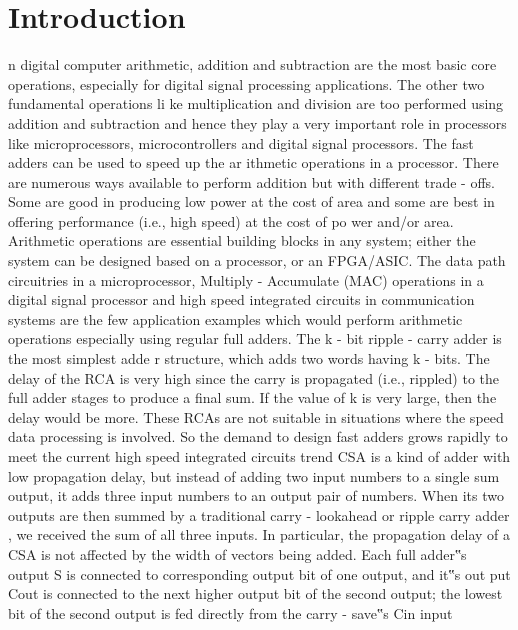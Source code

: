 \documentclass[11pt, twoside]{article}
\begin{document}
\section{Introduction}
n digital computer arithmetic, addition and subtraction are the most basic core operations, especially for 
digital  signal  processing  applications.  The  other  two  fundamental  operations  li
ke  multiplication  and 
division  are  too  performed  using  addition  and  subtraction  and  hence  they  play  a  very  important  role  in 
processors like microprocessors, microcontrollers and digital signal processors. The fast adders can be 
used to speed up the ar
ithmetic operations in a processor. There are numerous ways available to perform 
addition but with different trade
-
offs. Some are good in producing low power at the cost of area and some 
are best in offering performance (i.e., high speed) at the cost of po
wer and/or area.
Arithmetic  operations  are  essential  building  blocks  in  any  system;  either  the  system  can  be  designed 
based  on  a  processor,  or  an  FPGA/ASIC.  The  data  path  circuitries  in  a  microprocessor,  Multiply
-
Accumulate   (MAC)   operations   in   a 
digital   signal   processor   and   high   speed   integrated   circuits   in 
communication  systems  are  the  few  application  examples  which  would  perform  arithmetic  operations 
especially  using  regular  full  adders.  The  k
-
bit  ripple
-
carry  adder  is  the  most  simplest  adde
r  structure, 
which adds  two  words having  k
-
bits.  The  delay  of  the  RCA  is  very  high since  the  carry  is  propagated  (i.e., 
rippled) to the full adder stages to produce a final sum. If the value of k is very large, then the delay would 
be  more.  These  RCAs  are 
not  suitable  in  situations  where  the  speed  data  processing  is  involved.  So  the 
demand  to  design  fast  adders  grows  rapidly  to  meet  the  current  high  speed  integrated  circuits  trend 
CSA  is  a  kind  of  adder  with  low  propagation  delay,  but  instead  of  adding  two  input  numbers  to  a  single  sum 
output,  it adds three input  numbers to an output pair of  numbers. When its two outputs  are  then summed by a 
traditional  carry
-
lookahead  or
ripple  carry  adder
,  we  received  the  sum  of  all  three  inputs.  In  particular,  the 
propagation delay of a CSA is not affected by the width of vectors being added. Each full adder‟s output S is 
connected to corresponding output bit of one output, and it‟s out
put Cout is connected to the next higher output 
bit of the second output; the lowest bit of the second output is fed directly from the carry
-
save‟s Cin input
\end{document}
